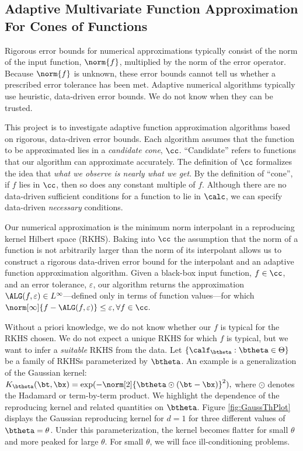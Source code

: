 \subsection{Adaptive Multivariate Function Approximation For Cones of Functions}

Rigorous error bounds for numerical approximations typically consist of the norm of the input function, $\norm{f}$, multiplied by the norm of the error operator.  Because $\norm{f}$ is unknown,  these error bounds cannot tell us whether a prescribed error tolerance has been met.  Adaptive numerical algorithms typically use heuristic, data-driven error bounds.  We do not know when they can be trusted.

This project is to investigate adaptive function approximation algorithms based on rigorous, data-driven error bounds.  Each algorithm assumes that the function to be approximated lies in a \emph{candidate cone}, $\cc$.  ``Candidate'' refers to functions that our algorithm can approximate accurately.  The definition of $\cc$ formalizes the idea that \emph{what we observe is nearly what we get}.  By the definition of ``cone'', if $f$ lies in $\cc$, then so does any constant multiple of $f$.  Although there are no data-driven sufficient conditions for a function to lie in $\calc$, we can specify data-driven \emph{necessary} conditions.

Our numerical approximation is the minimum norm interpolant in a reproducing kernel Hilbert space (RKHS).  Baking into $\cc$ the assumption that the norm of a function is not arbitrarily larger than the norm of its interpolant allows us to construct a rigorous data-driven error bound for the interpolant and an adaptive function approximation algorithm. Given a black-box input function, $f \in \cc$, and an error tolerance, $\varepsilon$, our algorithm returns the approximation $\ALG(f,\varepsilon) \in L^\infty$---defined only in terms of function values---for which 
$
\norm[\infty]{f - \ALG(f,\varepsilon)} \le \varepsilon, \forall f\in \cc.$

Without  a priori knowledge, we do not know whether our $f$ is typical for  the RKHS chosen.  We do not expect a unique RKHS for which $f$ is typical, but we want to infer a \emph{suitable} RKHS from the data.
Let $\{\calf_{\btheta} : \btheta \in \Theta\}$ be a family of RKHSs parameterized by $\btheta$.  An example is a generalization of the Gaussian kernel:
$
K_\btheta(\bt,\bx) =  \exp(-\norm[2]{\btheta \odot (\bt-\bx)}^2),
$
where $\odot$ denotes the Hadamard or term-by-term product. We highlight the dependence of the reproducing kernel and related quantities on $\btheta$.
Figure \ref{fig:GaussThPlot} displays the Gaussian reproducing kernel for $d=1$ for three different values of $\btheta = \theta$.  Under this parameterization, the kernel becomes flatter for small $\theta$ and more peaked for large $\theta$. For small $\theta$, we will face ill-conditioning problems.  

